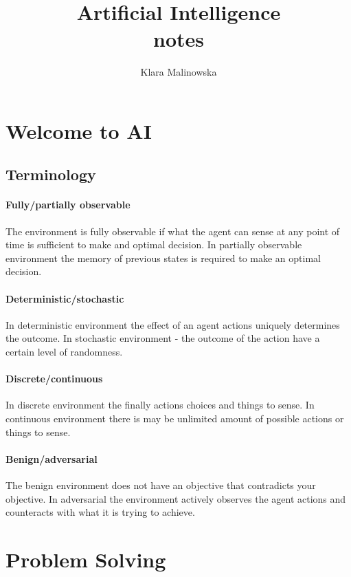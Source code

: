 \documentclass[a4paper,10pt]{article}
\title{Artificial Intelligence \\ notes}
\author{Klara Malinowska}
\begin{document}
\maketitle

\tableofcontents
\newpage

\section{Welcome to AI}
\subsection{Terminology}

\paragraph{Fully/partially observable}
The environment is fully observable if what the agent can sense at any point of time is sufficient to make and optimal decision. In partially observable environment the memory of previous states is required to make an optimal decision.

\paragraph{Deterministic/stochastic}
In deterministic environment the effect of an agent actions uniquely determines the outcome. In stochastic environment - the outcome of the action have a certain level of randomness.

\paragraph{Discrete/continuous}
In discrete environment the finally actions choices and things to sense. In continuous environment there is may be unlimited amount of possible actions or things to sense.

\paragraph{Benign/adversarial}
The benign environment does not have an objective that contradicts your objective. In adversarial the environment actively observes the agent actions and counteracts with what it is trying to achieve.

\section{Problem Solving}
\end{document}
